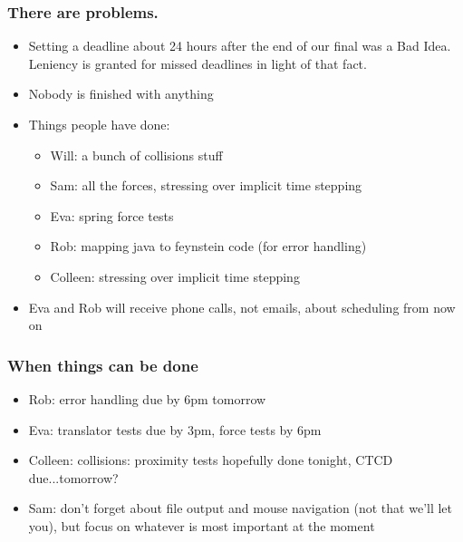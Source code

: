 \subsubsection*{There are problems.}
\begin{itemize}
\item Setting a deadline about 24 hours after the end of our final was a Bad Idea. Leniency is granted for missed deadlines in light of that fact.
\item Nobody is finished with anything
\item Things people have done:
  \begin{itemize}
  \item Will: a bunch of collisions stuff
  \item Sam: all the forces, stressing over implicit time stepping
  \item Eva: spring force tests
  \item Rob: mapping java to feynstein code (for error handling)
  \item Colleen: stressing over implicit time stepping
  \end{itemize}
\item Eva and Rob will receive phone calls, not emails, about
  scheduling from now on
\end{itemize}

\subsubsection*{When things can be done}
\begin{itemize}
\item Rob: error handling due by 6pm tomorrow
\item Eva: translator tests due by 3pm, force tests by 6pm
\item Colleen: collisions: proximity tests hopefully done tonight,
  CTCD due...tomorrow?
\item Sam: don't forget about file output and mouse navigation (not
  that we'll let you), but focus on whatever is most important at the
  moment
\end{itemize}